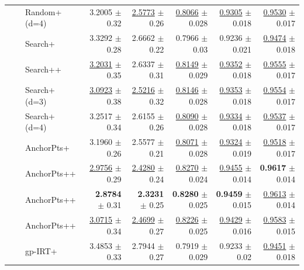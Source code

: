 \begin{longtable}{llp{}rrrrr}
 &  & Random+ (d=4) & 3.2005 {\scriptsize $\pm$ 0.32} & \underline{2.5773} {\scriptsize $\pm$ 0.26} & \underline{0.8066} {\scriptsize $\pm$ 0.028} & \underline{0.9305} {\scriptsize $\pm$ 0.018} & \underline{0.9530} {\scriptsize $\pm$ 0.017} \\
 &  & Search+ & 3.3292 {\scriptsize $\pm$ 0.28} & 2.6662 {\scriptsize $\pm$ 0.22} & 0.7966 {\scriptsize $\pm$ 0.03} & 0.9236 {\scriptsize $\pm$ 0.021} & \underline{0.9474} {\scriptsize $\pm$ 0.018} \\
 &  & Search++ & \underline{3.2031} {\scriptsize $\pm$ 0.35} & 2.6337 {\scriptsize $\pm$ 0.31} & \underline{0.8149} {\scriptsize $\pm$ 0.029} & \underline{0.9352} {\scriptsize $\pm$ 0.018} & \underline{0.9555} {\scriptsize $\pm$ 0.017} \\
 &  & Search+ (d=3) & \underline{3.0923} {\scriptsize $\pm$ 0.38} & \underline{2.5216} {\scriptsize $\pm$ 0.32} & \underline{0.8146} {\scriptsize $\pm$ 0.028} & \underline{0.9353} {\scriptsize $\pm$ 0.018} & \underline{0.9554} {\scriptsize $\pm$ 0.017} \\
 &  & Search+ (d=4) & 3.2517 {\scriptsize $\pm$ 0.34} & 2.6155 {\scriptsize $\pm$ 0.26} & \underline{0.8090} {\scriptsize $\pm$ 0.028} & \underline{0.9334} {\scriptsize $\pm$ 0.018} & \underline{0.9537} {\scriptsize $\pm$ 0.017} \\
 &  & AnchorPts+ & 3.1960 {\scriptsize $\pm$ 0.26} & 2.5577 {\scriptsize $\pm$ 0.21} & \underline{0.8071} {\scriptsize $\pm$ 0.028} & \underline{0.9324} {\scriptsize $\pm$ 0.019} & \underline{0.9518} {\scriptsize $\pm$ 0.017} \\
 &  & AnchorPts++ & \underline{2.9756} {\scriptsize $\pm$ 0.29} & \underline{2.4280} {\scriptsize $\pm$ 0.24} & \underline{0.8270} {\scriptsize $\pm$ 0.024} & \underline{0.9455} {\scriptsize $\pm$ 0.014} & \textbf{0.9617} {\scriptsize $\pm$ 0.014} \\
 &  & AnchorPts++ & \textbf{2.8784} {\scriptsize $\pm$ 0.31} & \textbf{2.3231} {\scriptsize $\pm$ 0.25} & \textbf{0.8280} {\scriptsize $\pm$ 0.025} & \textbf{0.9459} {\scriptsize $\pm$ 0.015} & \underline{0.9613} {\scriptsize $\pm$ 0.014} \\
 &  & AnchorPts++ & \underline{3.0715} {\scriptsize $\pm$ 0.34} & \underline{2.4699} {\scriptsize $\pm$ 0.27} & \underline{0.8226} {\scriptsize $\pm$ 0.025} & \underline{0.9429} {\scriptsize $\pm$ 0.016} & \underline{0.9583} {\scriptsize $\pm$ 0.015} \\
 &  & gp-IRT+ & 3.4853 {\scriptsize $\pm$ 0.33} & 2.7944 {\scriptsize $\pm$ 0.27} & 0.7919 {\scriptsize $\pm$ 0.029} & 0.9233 {\scriptsize $\pm$ 0.02} & \underline{0.9451} {\scriptsize $\pm$ 0.018} \\

\end{longtable}

